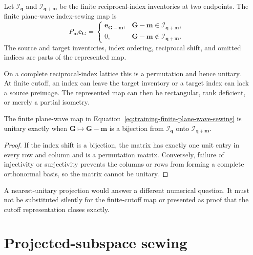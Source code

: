 \begin{definition}
\label{def:training-plane-wave-index-sewing}
Let \(\mathcal I_{\mathbf q}\) and
\(\mathcal I_{\mathbf q+\mathbf m}\) be the finite reciprocal-index inventories
at two endpoints. The finite plane-wave index-sewing map is
\begin{equation}
  P_{\mathbf m}\mathbf e_{\mathbf G}
  =
  \begin{cases}
    \mathbf e_{\mathbf G-\mathbf m},
      &\mathbf G-\mathbf m\in\mathcal I_{\mathbf q+\mathbf m},\\
    0,
      &\mathbf G-\mathbf m\notin\mathcal I_{\mathbf q+\mathbf m}.
  \end{cases}
  \label{eq:training-finite-plane-wave-sewing}
\end{equation}
The source and target inventories, index ordering, reciprocal shift, and omitted
indices are parts of the represented map.
\end{definition}

On a complete reciprocal-index lattice this is a permutation and hence unitary.
At finite cutoff, an index can leave the target inventory or a target index can
lack a source preimage. The represented map can then be rectangular, rank
deficient, or merely a partial isometry.

\begin{proposition}
\label{prop:training-plane-wave-sewing-unitarity}
The finite plane-wave map in
Equation~\eqref{eq:training-finite-plane-wave-sewing} is unitary exactly when
\(\mathbf G\mapsto\mathbf G-\mathbf m\) is a bijection from
\(\mathcal I_{\mathbf q}\) onto
\(\mathcal I_{\mathbf q+\mathbf m}\).
\end{proposition}

\begin{proof}
If the index shift is a bijection, the matrix has exactly one unit entry in every
row and column and is a permutation matrix. Conversely, failure of injectivity
or surjectivity prevents the columns or rows from forming a complete
orthonormal basis, so the matrix cannot be unitary.
\end{proof}

A nearest-unitary projection would answer a different numerical question. It
must not be substituted silently for the finite-cutoff map or presented as
proof that the cutoff representation closes exactly.

\section{Projected-subspace sewing}

